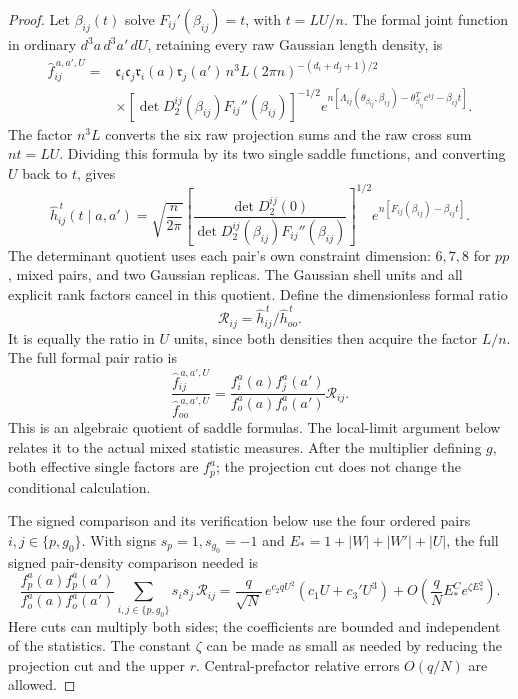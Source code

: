 \begin{proof}
Let \(\beta_{ij}(t)\) solve \(F_{ij}'(\beta_{ij})=t\), with
\(t=LU/n\). The formal joint function in ordinary
\(d^3a\,d^3a'\,dU\), retaining every raw Gaussian length density, is
\[
\begin{split}
 \widehat f_{ij}^{\,a,a',U}
 ={}&\mathfrak c_i\mathfrak c_j
       \mathfrak r_i(a)\mathfrak r_j(a')\,
       n^3L(2\pi n)^{-(d_i+d_j+1)/2}\\
 &\times[\det D_2^{ij}(\beta_{ij})F_{ij}''(\beta_{ij})]^{-1/2}
 e^{n[\Lambda_{ij}(\theta_{\beta_{ij}},\beta_{ij})
        -\theta_{\beta_{ij}}^Tc^{ij}-\beta_{ij}t]}.
\end{split}
\]
The factor \(n^3L\) converts the six raw projection sums and the
raw cross sum \(nt=LU\). Dividing this formula by its two single
saddle functions, and converting \(U\) back to \(t\), gives
\[
 \widehat h_{ij}^{\,t}(t\mid a,a')
 =\sqrt{\frac n{2\pi}}
 \left[\frac{\det D_2^{ij}(0)}
 {\det D_2^{ij}(\beta_{ij})F_{ij}''(\beta_{ij})}\right]^{1/2}
 e^{n[F_{ij}(\beta_{ij})-\beta_{ij}t]}.
\]
The determinant quotient uses each pair's own constraint dimension:
\(6,7,8\) for \(pp\), mixed pairs, and two Gaussian replicas.
The Gaussian shell units and all explicit rank factors cancel in
this quotient. Define the dimensionless formal ratio
\[
 \mathcal R_{ij}=
       \widehat h_{ij}^{\,t}/\widehat h_{oo}^{\,t}.
\]
It is equally the ratio in \(U\) units, since both densities then
acquire the factor \(L/n\). The full formal pair ratio is
\[
 \frac{\widehat f_{ij}^{\,a,a',U}}
      {\widehat f_{oo}^{\,a,a',U}}
 =\frac{f_i^a(a)f_j^a(a')}{f_o^a(a)f_o^a(a')}\mathcal R_{ij}.
\]
This is an algebraic quotient of saddle formulas. The local-limit
argument below relates it to the actual mixed statistic measures.
After the multiplier defining \(g\), both effective single factors
are \(f_p^a\); the projection cut does not change the conditional
calculation.

The signed comparison and its verification below use the four ordered
pairs \(i,j\in\{p,g_0\}\). With signs \(s_p=1,s_{g_0}=-1\) and
\(E_*=1+|W|+|W'|+|U|\), the full signed pair-density comparison needed is
\begin{equation}\label{prof:eq16}
\frac{f_p^a(a)f_p^a(a')}{f_o^a(a)f_o^a(a')}
 \sum_{i,j\in\{p,g_0\}}s_i s_j\,\mathcal R_{ij}
 =
 \frac{q}{\sqrt N}\,e^{c_2 q U^2}(c_1 U+c_3' U^3)
 +O\!\left(\frac qN E_*^C e^{\zeta E_*^2}\right).
\end{equation}
Here cuts can multiply both sides; the coefficients are bounded and independent of the statistics. The constant \(\zeta\) can be made as small as needed by reducing the projection cut and the upper \(r\). Central-prefactor relative errors \(O(q/N)\) are allowed.


\end{proof}
